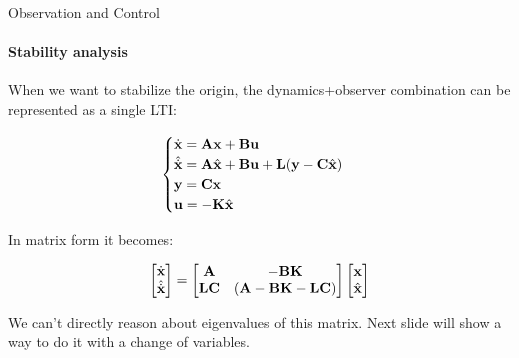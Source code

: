 \documentclass{beamer}
\begin{document}
\begin{frame}{Observation and Control}
\framesubtitle{Stability analysis}
\begin{flushleft}

When we want to stabilize the origin, the dynamics+observer combination can be represented as a single LTI:

\begin{equation}
\begin{cases}
\dot {\mathbf{x}} = \mathbf{A} \mathbf{x} + \mathbf{B} \mathbf{u} \\
\hat{\dot {\mathbf{x}}} = \mathbf{A} \hat{\mathbf{x}} + \mathbf{B} \mathbf u + \mathbf{L}(\mathbf y - \mathbf{C} \hat{\mathbf{x}})\\
\mathbf{y} = \mathbf{C} \mathbf{x} \\
\mathbf{u} = -\mathbf{K} \hat{\mathbf{x}}
\end{cases}
\end{equation}

In matrix form it becomes:

\begin{equation}
\begin{bmatrix}
\dot {\mathbf{x}} \\
\hat{\dot {\mathbf{x}}}
\end{bmatrix}
=
\begin{bmatrix}
\mathbf{A} & -\mathbf{B}\mathbf{K} \\
\mathbf{L}\mathbf{C} & (\mathbf{A} - \mathbf{B}\mathbf{K}-\mathbf{L}\mathbf{C})
\end{bmatrix}
\begin{bmatrix}
\mathbf{x} \\
\hat{\mathbf{x}}
\end{bmatrix}
\end{equation}

\bigskip

We can't directly reason about eigenvalues of this matrix. Next slide will show a way to do it with a change of variables.

\end{flushleft}
\end{frame}
\end{document}
